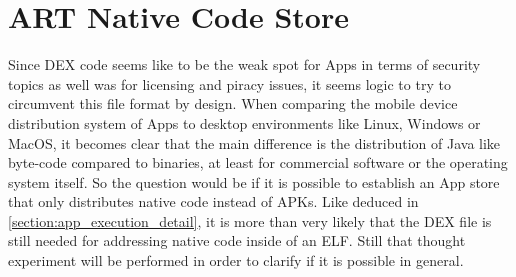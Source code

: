 \chapter{ART Native Code Store}\label{chapter:native_code_store}

Since DEX code seems like to be the weak spot for Apps in terms of security
topics as well was for licensing and piracy issues, it seems logic to try
to circumvent this file format by design.
When comparing the mobile device distribution
system of Apps to desktop environments like Linux, Windows or MacOS, it becomes clear that the main difference is the distribution of Java like byte-code compared to binaries, at least for commercial software or the operating system itself. So the question would be if it is possible to establish an App store that only distributes native code instead of APKs. Like deduced in \autoref{section:app_execution_detail}, it is more than very likely that the DEX file is still needed for addressing native code inside of an ELF.
Still that thought experiment will be performed in order to clarify if it is possible in general.

